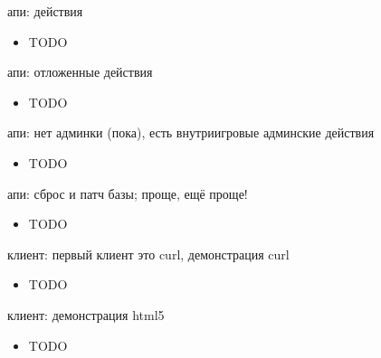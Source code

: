 \documentclass[aspectratio=169,handout,bigger]{beamer}
\begin{document}

\begin{frame}{апи: действия}
  \begin{itemize}
    \item TODO
  \end{itemize}
\end{frame}


\begin{frame}{апи: отложенные действия}
  \begin{itemize}
    \item TODO
  \end{itemize}
\end{frame}


\begin{frame}{апи: нет админки (пока), есть внутриигровые админские действия}
  \begin{itemize}
    \item TODO
  \end{itemize}
\end{frame}


\begin{frame}{апи: сброс и патч базы; проще, ещё проще!}
  \begin{itemize}
    \item TODO
  \end{itemize}
\end{frame}


\begin{frame}{клиент: первый клиент это curl, демонстрация curl}
  \begin{itemize}
    \item TODO
  \end{itemize}
\end{frame}


\begin{frame}{клиент: демонстрация html5}
  \begin{itemize}
    \item TODO
  \end{itemize}
\end{frame}
\end{document}
